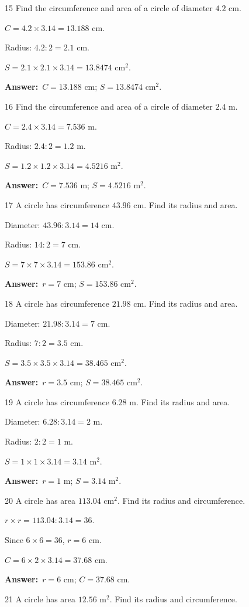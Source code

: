 \documentclass[11pt]{article}
\newif\ifsol \solfalse
\providecommand{\AnsWord}{Đáp số}
\newcommand{\dapso}[1]{\par\textbf{\AnsWord:}\ #1}
\newcommand{\probsol}[1]{%
  \begin{lrbox}{\solmeasure}\begin{minipage}{\dimexpr\linewidth-24pt\relax}#1\end{minipage}\end{lrbox}%
  \ifsol
    \begin{solbox}#1\end{solbox}%
  \else
    \setlength{\solht}{\dimexpr\ht\solmeasure+\dp\solmeasure+0.85cm\relax}%
    \ifdim\solht<1.35cm\setlength{\solht}{1.35cm}\fi
    \begin{tcolorbox}[colback=white,colframe=Line,boxrule=0.8pt,arc=5pt,
      left=8pt,right=8pt,top=4pt,bottom=4pt,height=\solht]{\footnotesize\color{Slate}\itshape\WorkWord}\end{tcolorbox}%
  \fi}
\newcommand{\gap}{\vspace{0.3cm}}
\def\WorkWord{Your work:}
\def\AnsWord{Answer}
\begin{document}
\gap
\begin{probbox}{15}{\relax}
Find the circumference and area of a circle of diameter $4.2$ cm.
\end{probbox}
\probsol{
$C=4.2\times3.14=13.188$ cm.\par Radius: $4.2:2=2.1$ cm.\par $S=2.1\times2.1\times3.14=13.8474$ cm$^2$.
\dapso{$C=13.188$ cm; $S=13.8474$ cm$^2$.}}
\gap
\begin{probbox}{16}{\relax}
Find the circumference and area of a circle of diameter $2.4$ m.
\end{probbox}
\probsol{
$C=2.4\times3.14=7.536$ m.\par Radius: $2.4:2=1.2$ m.\par $S=1.2\times1.2\times3.14=4.5216$ m$^2$.
\dapso{$C=7.536$ m; $S=4.5216$ m$^2$.}}
\gap
\begin{probbox}{17}{\relax}
A circle has circumference $43.96$ cm. Find its radius and area.
\end{probbox}
\probsol{
Diameter: $43.96:3.14=14$ cm.\par Radius: $14:2=7$ cm.\par $S=7\times7\times3.14=153.86$ cm$^2$.
\dapso{$r=7$ cm; $S=153.86$ cm$^2$.}}
\gap
\begin{probbox}{18}{\relax}
A circle has circumference $21.98$ cm. Find its radius and area.
\end{probbox}
\probsol{
Diameter: $21.98:3.14=7$ cm.\par Radius: $7:2=3.5$ cm.\par $S=3.5\times3.5\times3.14=38.465$ cm$^2$.
\dapso{$r=3.5$ cm; $S=38.465$ cm$^2$.}}
\gap
\begin{probbox}{19}{\relax}
A circle has circumference $6.28$ m. Find its radius and area.
\end{probbox}
\probsol{
Diameter: $6.28:3.14=2$ m.\par Radius: $2:2=1$ m.\par $S=1\times1\times3.14=3.14$ m$^2$.
\dapso{$r=1$ m; $S=3.14$ m$^2$.}}
\gap
\begin{probbox}{20}{\relax}
A circle has area $113.04$ cm$^2$. Find its radius and circumference.
\end{probbox}
\probsol{
$r\times r=113.04:3.14=36$.\par Since $6\times6=36$, $r=6$ cm.\par $C=6\times2\times3.14=37.68$ cm.
\dapso{$r=6$ cm; $C=37.68$ cm.}}
\gap
\begin{probbox}{21}{\relax}
A circle has area $12.56$ m$^2$. Find its radius and circumference.
\end{probbox}
\end{document}
